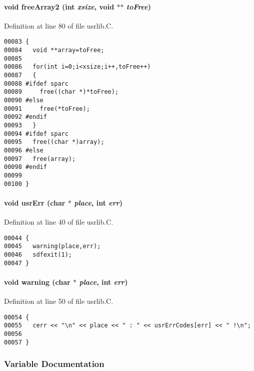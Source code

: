 \paragraph{\setlength{\rightskip}{0pt plus 5cm}void free\-Array2 (int {\em xsize}, void $\ast$$\ast$ {\em to\-Free})}\hfill



Definition at line 80 of file usrlib.C.\small\begin{verbatim}00083 {
00084   void **array=toFree;
00085 
00086   for(int i=0;i<xsize;i++,toFree++)
00087   {
00088 #ifdef sparc
00089     free((char *)*toFree);
00090 #else
00091     free(*toFree);
00092 #endif
00093   }
00094 #ifdef sparc
00095   free((char *)array);
00096 #else
00097   free(array);
00098 #endif
00099 
00100 }
\end{verbatim}\normalsize 
\label{usrlib.C_a0}
\paragraph{\setlength{\rightskip}{0pt plus 5cm}void usr\-Err (char $\ast$ {\em place}, int {\em err})}\hfill



Definition at line 40 of file usrlib.C.\small\begin{verbatim}00044 {
00045   warning(place,err);
00046   sdfexit(1);
00047 }
\end{verbatim}\normalsize 
\label{usrlib.C_a1}
\paragraph{\setlength{\rightskip}{0pt plus 5cm}void warning (char $\ast$ {\em place}, int {\em err})}\hfill



Definition at line 50 of file usrlib.C.\small\begin{verbatim}00054 {
00055   cerr << "\n" << place << " : " << usrErrCodes[err] << " !\n";
00056 
00057 }
\end{verbatim}\normalsize 


\subsubsection{Variable Documentation}
\label{usrlib.C_a4}
